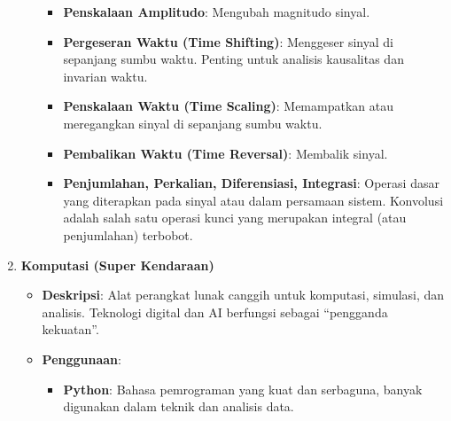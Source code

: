 \documentclass[
  letterpaper,
  DIV=11,
  numbers=noendperiod]{scrreprt}
\providecommand{\tightlist}{%
  \setlength{\itemsep}{0pt}\setlength{\parskip}{0pt}}
\begin{document}
\begin{enumerate}
\begin{itemize}
    \begin{itemize}
    \tightlist
    \item
      \textbf{Penskalaan Amplitudo}: Mengubah magnitudo sinyal.
    \item
      \textbf{Pergeseran Waktu (Time Shifting)}: Menggeser sinyal di
      sepanjang sumbu waktu. Penting untuk analisis kausalitas dan
      invarian waktu.
    \item
      \textbf{Penskalaan Waktu (Time Scaling)}: Memampatkan atau
      meregangkan sinyal di sepanjang sumbu waktu.
    \item
      \textbf{Pembalikan Waktu (Time Reversal)}: Membalik sinyal.
    \item
      \textbf{Penjumlahan, Perkalian, Diferensiasi, Integrasi}: Operasi
      dasar yang diterapkan pada sinyal atau dalam persamaan sistem.
      Konvolusi adalah salah satu operasi kunci yang merupakan integral
      (atau penjumlahan) terbobot.
    \end{itemize}
  \end{itemize}
\item
  \textbf{Komputasi (Super Kendaraan)}

  \begin{itemize}
  \tightlist
  \item
    \textbf{Deskripsi}: Alat perangkat lunak canggih untuk komputasi,
    simulasi, dan analisis. Teknologi digital dan AI berfungsi sebagai
    ``pengganda kekuatan''.
  \item
    \textbf{Penggunaan}:

    \begin{itemize}
    \tightlist
    \item
      \textbf{Python}: Bahasa pemrograman yang kuat dan serbaguna,
      banyak digunakan dalam teknik dan analisis data.


\end{itemize}
\end{itemize}
\end{enumerate}
\end{document}
